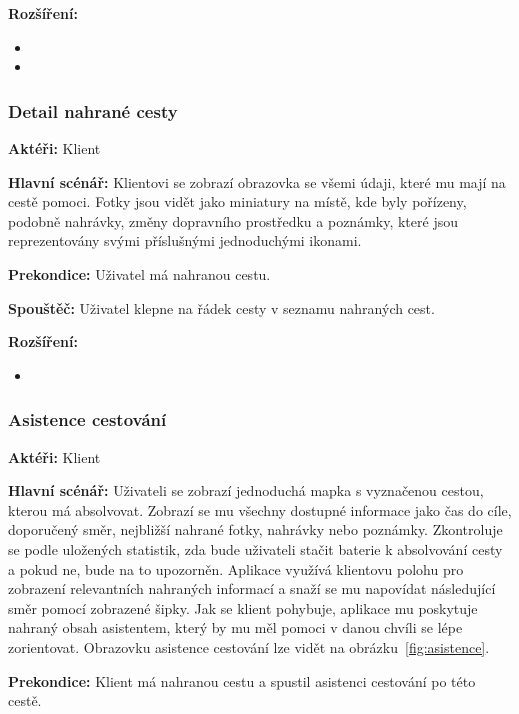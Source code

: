 \documentclass[czech,master,public,dept460,male,java,cpdeclaration]{diploma}
\newcommand{\usecase}[2]{\subsubsection{#1}\label{#2}}
\begin{document}
\vspace{0.1cm}
\noindent
\textbf{Rozšíření:}
\begin{itemize}
  \item {}
  \item {}
\end{itemize}

\usecase{Detail nahrané cesty}{detailklient}
\textbf{Aktéři:} Klient

\vspace{0.1cm}
\noindent
\textbf{Hlavní scénář:} Klientovi se zobrazí obrazovka se všemi údaji, které mu mají na cestě pomoci.
Fotky jsou vidět jako miniatury na místě, kde byly pořízeny, podobně nahrávky, změny dopravního prostředku
a poznámky, které jsou reprezentovány svými příslušnými jednoduchými ikonami.

\vspace{0.1cm}
\noindent
\textbf{Prekondice:} Uživatel má nahranou cestu.

\vspace{0.1cm}
\noindent
\textbf{Spouštěč:} Uživatel klepne na řádek cesty v seznamu nahraných cest.

\vspace{0.1cm}
\noindent
\textbf{Rozšíření:}
\begin{itemize}
  \item {}
\end{itemize}


\usecase{Asistence cestování}{asistence}
\textbf{Aktéři:} Klient

\vspace{0.1cm}
\noindent
\textbf{Hlavní scénář:} Uživateli se zobrazí jednoduchá mapka s vyznačenou cestou, kterou má absolvovat.
Zobrazí se mu všechny dostupné informace jako čas do cíle, doporučený směr, nejbližší nahrané fotky,
nahrávky nebo poznámky. Zkontroluje se podle uložených statistik, zda bude uživateli stačit baterie
k absolvování cesty a pokud ne, bude na to upozorněn.
Aplikace využívá klientovu polohu pro zobrazení relevantních nahraných informací
a snaží se mu napovídat následující směr pomocí zobrazené šipky. Jak se klient pohybuje, aplikace mu
poskytuje nahraný obsah asistentem, který by mu měl pomoci v danou chvíli se lépe zorientovat.
Obrazovku asistence cestování lze vidět na obrázku~\ref{fig:asistence}.

\vspace{0.1cm}
\noindent
\textbf{Prekondice:} Klient má nahranou cestu a spustil asistenci cestování po této cestě.
\end{document}
